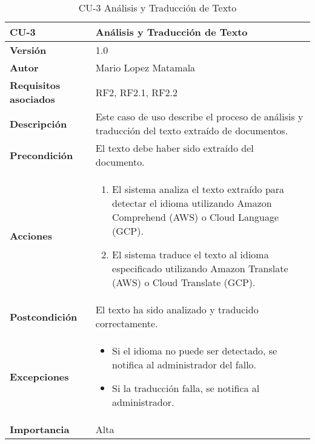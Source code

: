 \begin{table}[p]
\centering
\begin{tabularx}{\linewidth}{ p{} p{} }
\toprule
\textbf{CU-3} & \textbf{Análisis y Traducción de Texto} \\
\toprule
\textbf{Versión} & 1.0 \\
\textbf{Autor} & Mario Lopez Matamala \\
\textbf{Requisitos asociados} & RF2, RF2.1, RF2.2 \\
\textbf{Descripción} & Este caso de uso describe el proceso de análisis y traducción del texto extraído de documentos. \\
\textbf{Precondición} & El texto debe haber sido extraído del documento. \\
\textbf{Acciones} &
\begin{enumerate}
\def\labelenumi{\arabic{enumi}.}
\tightlist
\item El sistema analiza el texto extraído para detectar el idioma utilizando Amazon Comprehend (AWS) o Cloud Language (GCP).
\item El sistema traduce el texto al idioma especificado utilizando Amazon Translate (AWS) o Cloud Translate (GCP).
\end{enumerate} \\
\textbf{Postcondición} & El texto ha sido analizado y traducido correctamente. \\
\textbf{Excepciones} &
\begin{itemize}
\item Si el idioma no puede ser detectado, se notifica al administrador del fallo.
\item Si la traducción falla, se notifica al administrador.
\end{itemize} \\
\textbf{Importancia} & Alta \\
\bottomrule
\end{tabularx}
\caption{CU-3 Análisis y Traducción de Texto}
\label{tab:cu3}
\end{table}

\vspace{1cm}

